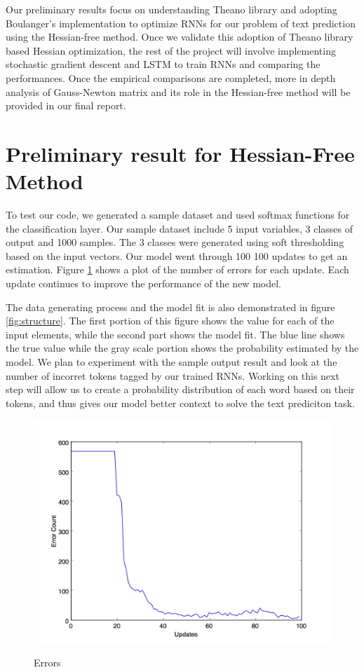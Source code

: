 \documentclass{article} %
\begin{document}
Our preliminary results focus on understanding Theano library and adopting Boulanger's implementation to optimize RNNs for our problem of text prediction using the Hessian-free method. Once we validate this adoption of Theano library based Hessian optimization, the rest of the project will involve implementing stochastic gradient descent and LSTM to train RNNs and comparing the performances. Once the empirical comparisons are completed, more in depth analysis of Gauss-Newton matrix and its role in the Hessian-free method will be provided in our final report.

\newpage

\section{Preliminary result for Hessian-Free Method}

To test our code, we generated a sample dataset and used softmax functions for the classification layer. Our sample dataset include 5 input variables, 3 classes of output and 1000 samples.  The 3 classes were generated using soft thresholding based on the input vectors. Our model went through 100 100 updates to get an estimation. Figure \ref{fig:error} shows a plot of the number of errors for each update. Each update continues to improve the performance of the new model. 

The data generating process and the model fit is also demonstrated in figure \ref{fig:structure}.  The first portion of this figure shows the value for each of the input elements, while the second part shows the model fit.  The blue line shows the true value while the gray scale portion shows the probability estimated by the model. We plan to experiment with the sample output result and look at the number of incorret tokens tagged by our trained RNNs. Working on this next step will allow us to create a probability distribution of each word based on their tokens, and thus gives our model better context to solve the text prediciton task.

\begin{figure}
\centering
\caption{Errors}
\includegraphics[width=0.5\linewidth]{errors.jpg}
\label{fig:error}
\end{figure}
\end{document}
